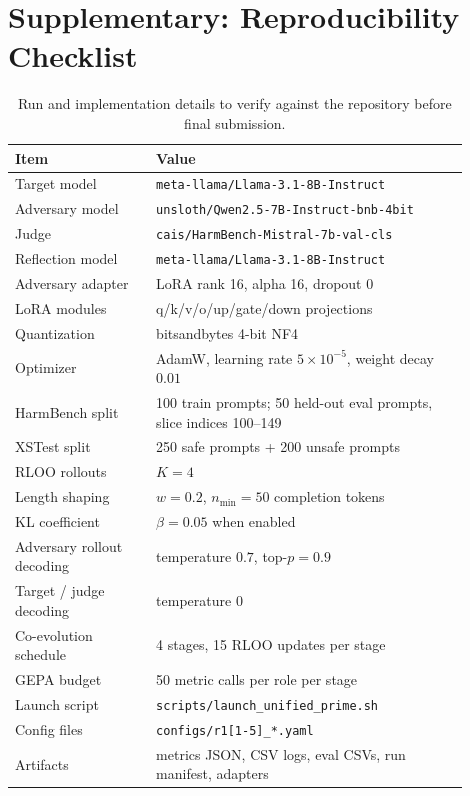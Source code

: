 \clearpage
\appendix
\onecolumn

\section{Supplementary: Reproducibility Checklist}

\begin{table}[h]
\centering
\caption{Run and implementation details to verify against the repository before final submission.}
\label{tab:repro}
\begin{tabular}{p{0.28\linewidth}p{0.62\linewidth}}
\toprule
Item & Value \\
\midrule
Target model & \texttt{meta-llama/Llama-3.1-8B-Instruct} \\
Adversary model & \texttt{unsloth/Qwen2.5-7B-Instruct-bnb-4bit} \\
Judge & \texttt{cais/HarmBench-Mistral-7b-val-cls} \\
Reflection model & \texttt{meta-llama/Llama-3.1-8B-Instruct} \\
Adversary adapter & LoRA rank 16, alpha 16, dropout 0 \\
LoRA modules & q/k/v/o/up/gate/down projections \\
Quantization & bitsandbytes 4-bit NF4 \\
Optimizer & AdamW, learning rate $5\times 10^{-5}$, weight decay $0.01$ \\
HarmBench split & 100 train prompts;
50 held-out eval prompts, slice indices 100--149 \\
XSTest split & 250 safe prompts + 200 unsafe prompts \\
RLOO rollouts & $K=4$ \\
Length shaping & $w=0.2$, $n_{\min}=50$ completion tokens \\
KL coefficient & $\beta=0.05$ when enabled \\
Adversary rollout decoding & temperature $0.7$, top-$p=0.9$ \\
Target / judge decoding & temperature $0$ \\
Co-evolution schedule & 4 stages, 15 RLOO updates per stage \\
GEPA budget & 50 metric calls per role per stage \\
Launch script & \texttt{scripts/launch\_unified\_prime.sh} \\
Config files & \texttt{configs/r1[1-5]\_*.yaml} \\
Artifacts & metrics JSON, CSV logs, eval CSVs, run manifest, adapters \\
\bottomrule
\end{tabular}
\end{table}

